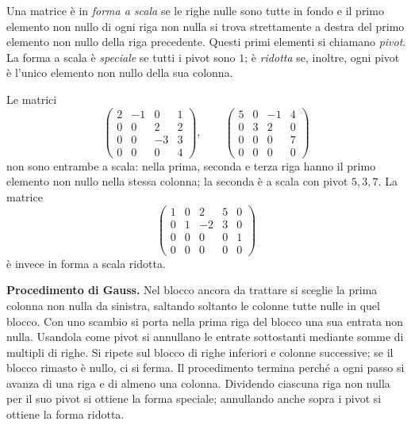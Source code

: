 \begin{definizione}
Una matrice è in \emph{forma a scala} se le righe nulle sono tutte in fondo e il primo elemento non nullo di ogni riga non nulla si trova strettamente a destra del primo elemento non nullo della riga precedente. Questi primi elementi si chiamano \emph{pivot}. La forma a scala è \emph{speciale} se tutti i pivot sono $1$; è \emph{ridotta} se, inoltre, ogni pivot è l'unico elemento non nullo della sua colonna.
\end{definizione}
\begin{esempio}
Le matrici
\[
 \begin{pmatrix}2&-1&0&1\\0&0&2&2\\0&0&-3&3\\0&0&0&4\end{pmatrix},\qquad
 \begin{pmatrix}5&0&-1&4\\0&3&2&0\\0&0&0&7\\0&0&0&0\end{pmatrix}
\]
non sono entrambe a scala: nella prima, seconda e terza riga hanno il primo elemento non nullo nella stessa colonna; la seconda è a scala con pivot $5,3,7$. La matrice
\[
 \begin{pmatrix}1&0&2&5&0\\0&1&-2&3&0\\0&0&0&0&1\\0&0&0&0&0\end{pmatrix}
\]
è invece in forma a scala ridotta.
\end{esempio}

\textbf{Procedimento di Gauss.} Nel blocco ancora da trattare si sceglie la prima colonna non nulla da sinistra, saltando soltanto le colonne tutte nulle in quel blocco. Con uno scambio si porta nella prima riga del blocco una sua entrata non nulla. Usandola come pivot si annullano le entrate sottostanti mediante somme di multipli di righe. Si ripete sul blocco di righe inferiori e colonne successive; se il blocco rimasto è nullo, ci si ferma. Il procedimento termina perché a ogni passo si avanza di una riga e di almeno una colonna. Dividendo ciascuna riga non nulla per il suo pivot si ottiene la forma speciale; annullando anche sopra i pivot si ottiene la forma ridotta.

